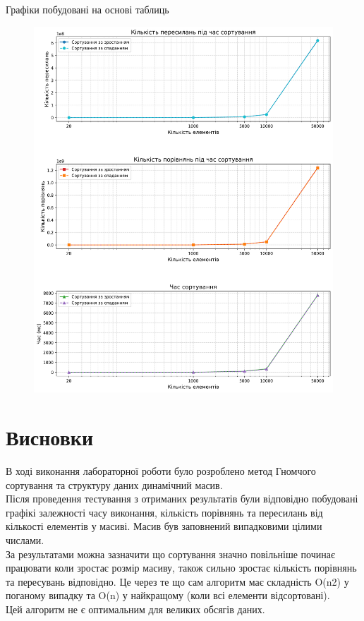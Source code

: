 \clearpage
Графіки побудовані на основі таблиць
\begin{figure}[h!]
  \centering
  \includegraphics[width=18cm]{reports/algos/lab11/assets/plot.png}
\end{figure}

\clearpage
\section{Висновки}
В ході виконання лабораторної роботи було розроблено метод Гномчого сортування та структуру даних динамічний масив.\\

Після проведення тестування з отриманих результатів були відповідно побудовані графікі залежності часу виконання, кількість порівнянь та пересилань від кількості елементів у масиві. Масив був заповнений випадковими цілими числами.\\

За результатами можна зазначити що сортування значно повільніше починає працювати коли зростає розмір масиву, також сильно зростає кількість порівнянь та пересувань відповідно. Це через те що сам алгоритм має складність  O(n2) у поганому випадку та O(n) у найкращому (коли всі елементи відсортовані).\\

Цей алгоритм не є оптимальним для великих обсягів даних.




